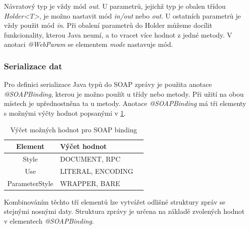 \documentclass[11pt,twoside,a4paper]{book}
\begin{document}
Návratový typ je vždy mód {\em out}. U parametrů, jejichž typ je obalen
třídou {\em Holder<T>}, je možno nastavit mód {\em in/out} nebo {\em out}. U
ostatních parametrů je vždy použit mód {\em in}. Při obalení parametrů do Holder
můžeme docílit funkcionality, kterou Java neumí, a to vracet více hodnot z
jedné metody. V anotaci {\em @WebParam} se elementem {\em mode} nastavuje mód.

\subsubsection{Serializace dat}
\label{subsec:serializace-dat}

Pro definici serializace Java typů do SOAP zprávy je použita anotace {\em @SOAPBinding}, kterou
je možno použít u třídy nebo metody.
Při užití na obou místech je upřednostněna ta u metody. Anotace {\em @SOAPBinding} má
tři elementy s možnými výčty hodnot popsanými v
\ref{tab:soap-binding-vycet-hodnot}.

\begin{table}[h]
\begin{center}
\begin{tabular}{|c|l|l|}
\hline
\textbf{Element} & \textbf{Výčet hodnot} \\
\hline
Style & DOCUMENT, RPC \\
\hline
Use & LITERAL, ENCODING \\
\hline
ParameterStyle & WRAPPER, BARE \\
\hline
\end{tabular}
\end{center}
\caption{Výčet možných hodnot pro SOAP binding}
\label{tab:soap-binding-vycet-hodnot}
\end{table}

Kombinováním těchto tří elementů lze vytvářet odlišné struktury zpráv se stejnými nosnými
daty. Struktura zprávy je určena na základě zvolených hodnot v elementech {\em @SOAPBinding}.
\end{document}
